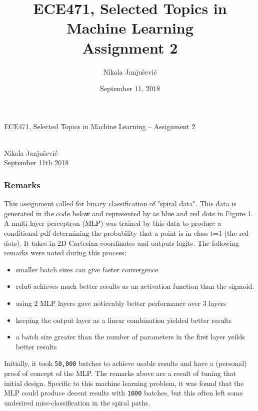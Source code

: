 \documentclass[10pt,a4paper]{article}
\author{Nikola Janju\v{s}evi\'{c}}
\title{ECE471, Selected Topics in Machine Learning \\ Assignment 2}
\date{September 11, 2018}
\begin{document}
\begin{large}
ECE471, Selected Topics in Machine Learning -- Assignment 2
\end{large} \\
Nikola Janju\v{s}evi\'{c} \\
September 11th 2018 

\subsubsection*{Remarks}
This assignment called for binary classification of "spiral data". This data is generated in the code below and represented by as blue and red dots in Figure 1. A multi-layer perceptron (MLP) was trained by this data to produce a conditional pdf determining the probability that a point is in class t=1 (the red dots). It takes in 2D Cartesian coordinates and outputs logits. The following remarks were noted during this process:
\begin{itemize}
\item smaller batch sizes can give faster convergence
\item relu6 achieves much better results as an activation function than the sigmoid.
\item using 2 MLP layers gave noticeably better performance over 3 layers
\item keeping the output layer as a linear combination yielded better results
\item a batch size greater than the number of parameters in the first layer yeilds better results
\end{itemize}
Initially, it took \verb|50,000| batches to achieve usable results and have a (personal) proof of concept of the MLP. The remarks above are a result of tuning that initial design. Specific to this machine learning problem, it was found that the MLP could produce decent results with \verb|1000| batches, but this often left some undesired miss-classification in the spiral paths. 
\end{document}
